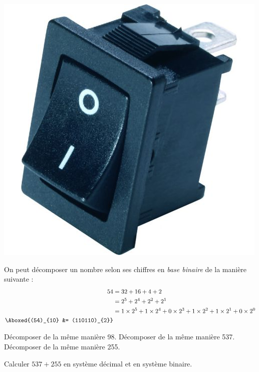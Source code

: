 \documentclass["../Cours.tex"]{subfiles}
\begin{document}
\begin{questions}
    \begin{center}
        \includegraphics[scale=0.2]{4 - Quatrieme/problemes/72374-9540269.jpg}
    \end{center}

    \question On peut décomposer un nombre selon ses chiffres en \emph{base binaire} de la manière suivante : 
    \begin{align*}
        54 &= 32 + 16 + 4 + 2 \\
        &= 2^5 + 2^4 + 2^2 + 2^1 \\
        &= 1 \times 2^5 + 1 \times 2^4 + 0 \times 2^3 + 1 \times 2^2 + 1 \times 2^1 + 0 \times 2^0 \\
        \Aboxed{(54)_{10} &= (110110)_{2}}
    \end{align*}

    \subquestion Décomposer de la même manière 98.
    \subquestion Décomposer de la même manière 537.
    \subquestion Décomposer de la même manière 255.

    \question Calculer $537+255$ en système décimal et en système binaire.


\end{questions}
\end{document}
